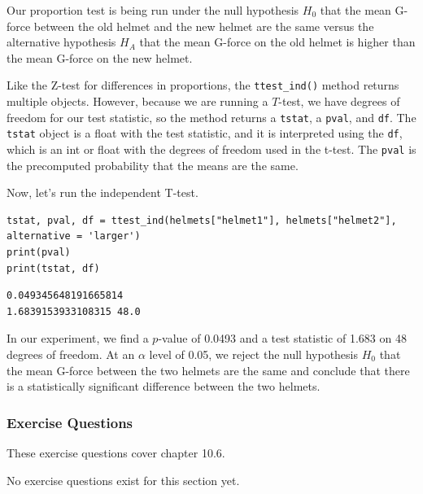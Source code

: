 Our proportion test is being run under the null hypothesis $H_0$ that the mean G-force between the old helmet and the new helmet are the same versus the alternative hypothesis $H_A$ that the mean G-force on the old helmet is higher than the mean G-force on the new helmet.\par
Like the Z-test for differences in proportions, the \verb|ttest_ind()| method returns multiple objects. However, because we are running a $T$-test, we have degrees of freedom for our test statistic, so the method returns a \verb|tstat|, a \verb|pval|, and \verb|df|. The \verb|tstat| object is a float with the test statistic, and it is interpreted using the \verb|df|, which is an int or float with the degrees of freedom used in the t-test. The \verb|pval| is the precomputed probability that the means are the same.\par
Now, let's run the independent T-test.\par
\begin{lstlisting}[style=pippython]
tstat, pval, df = ttest_ind(helmets["helmet1"], helmets["helmet2"], alternative = 'larger')
print(pval)
print(tstat, df)
\end{lstlisting}
\begin{lstlisting}[style=none]
0.049345648191665814
1.6839153933108315 48.0
\end{lstlisting}
In our experiment, we find a $p$-value of 0.0493 and a test statistic of 1.683 on 48 degrees of freedom. At an $\alpha$ level of 0.05, we reject the null hypothesis $H_0$ that the mean G-force between the two helmets are the same and conclude that there is a statistically significant difference between the two helmets.

\subsubsection*{Exercise Questions}
These exercise questions cover chapter 10.6.

No exercise questions exist for this section yet.

